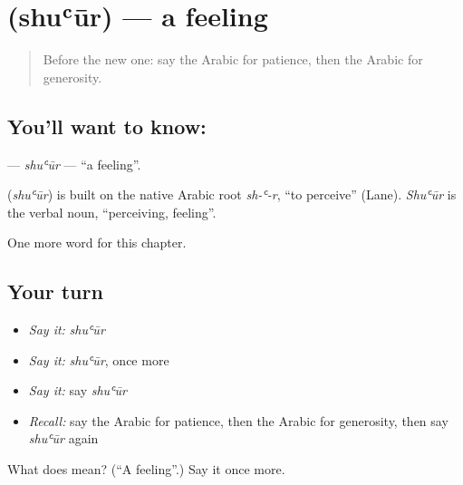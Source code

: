 \section[\texorpdfstring{\ar{شعور} (shuʿūr)}{شعور (shuʿūr)}]{ (shuʿūr) — a feeling}

\label{lesson:AR-C237-shuur}



\begin{quote}
Before the new one: say the Arabic for patience, then the Arabic for generosity.
\end{quote}

\subsection*{You'll want to know: }
\textbf{} — \emph{shuʿūr} — \textquotedblleft{}a feeling\textquotedblright{}.

\begin{cousinweb}
\textbf{} (\emph{shuʿūr}) is built on the native Arabic root \emph{sh-ʿ-r}, \textquotedblleft{}to perceive\textquotedblright{} (Lane). \emph{Shuʿūr} is the verbal noun, \textquotedblleft{}perceiving, feeling\textquotedblright{}.
\end{cousinweb}

\begin{grammarlens}[title={What you've built}]
One more word for this chapter.
\end{grammarlens}

\subsection*{Your turn}
\begin{itemize}
\raggedright
  \item \emph{Say it:} \emph{shuʿūr}
  \item \emph{Say it:} \emph{shuʿūr}, once more
  \item \emph{Say it:} say \emph{shuʿūr}
  \item \emph{Recall:} say the Arabic for patience, then the Arabic for generosity, then say \emph{shuʿūr} again
\end{itemize}

\begin{tcolorbox}[breakable,colback=teal!4,colframe=teal!35!black,title={Before you move on}]
What does  mean? (\textquotedblleft{}A feeling\textquotedblright{}.) Say it once more.
\end{tcolorbox}
